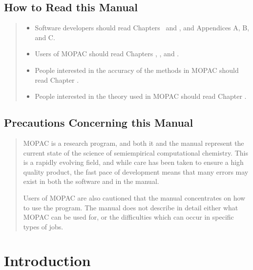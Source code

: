\section*{How to Read this Manual}
\begin{quote}
\begin{itemize}

\item Software developers should read Chapters \thetheorychapter\ and \theprogramchapter,  and Appendices A,
B, and C.

\item Users of MOPAC should read Chapters  \thedatachapter, \thetheorychapter, and \theerrorchapter.

\item People interested in the accuracy of the methods in MOPAC should read
Chapter \theaccuracychapter.

\item People interested in the theory used in MOPAC should read Chapter \thetheorychapter.
\end{itemize}
\end{quote}

\section*{Precautions Concerning this Manual}
\begin{quote}
MOPAC is a research program, and both it and the manual represent the current
state of the science of semiempirical computational chemistry. This is a
rapidly evolving field, and while care has been taken to ensure a high quality
product, the fast pace of development means that many errors may exist in both
the software and in the manual.

Users of MOPAC are also cautioned that the manual concentrates on how to use
the program.  The manual does not describe in detail either what MOPAC can be
used for, or the difficulties which can occur in specific types of jobs.
\end{quote}

\tableofcontents
\listoftables
\listoffigures

\chapter{Introduction}

